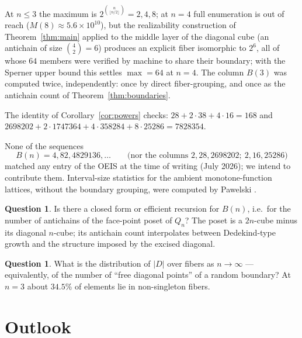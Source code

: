 \documentclass[11pt]{amsart}
\theoremstyle{definition}
\newtheorem{ques}[thm]{Question}
\newcommand{\lc}{Q}                       %
\begin{document}
At $n \le 3$ the maximum is $2^{\binom{n}{\lfloor n/2\rfloor}} =
2, 4, 8$; at $n = 4$ full enumeration is out of reach
($M(8) \approx 5.6 \times 10^{10}$), but the realizability
construction of Theorem~\ref{thm:main} applied to the middle layer
of the diagonal cube (an antichain of size $\binom{4}{2} = 6$)
produces an explicit fiber isomorphic to $2^{6}$, all of whose $64$
members were verified by machine to share their boundary; with the
Sperner upper bound this settles $\max = 64$ at $n = 4$.  The
column $B(3)$ was computed twice, independently: once by direct
fiber-grouping, and once as the antichain count of
Theorem~\ref{thm:boundaries}.

The identity of Corollary~\ref{cor:powers} checks:
$28 + 2\cdot 38 + 4 \cdot 16 = 168$ and
$2698202 + 2\cdot 1747364 + 4\cdot 358284 + 8 \cdot 25286 =
7828354$.

None of the sequences
\[
  B(n) = 4, 82, 4829136, \dots \qquad
  \text{(nor the columns } 2,28,2698202;\ 2,16,25286\text{)}
\]
matched any entry of the OEIS \cite{OEIS} at the time of writing
(July 2026); we intend to contribute them.  Interval-size statistics
for the ambient monotone-function lattices, without the boundary
grouping, were computed by Pawelski \cite{Pawelski}.

\begin{ques}
  Is there a closed form or efficient recursion for $B(n)$, i.e.\ for
  the number of antichains of the face-point poset of $\lc_n$?  The
  poset is a $2n$-cube minus its diagonal $n$-cube; its antichain
  count interpolates between Dedekind-type growth and the structure
  imposed by the excised diagonal.
\end{ques}

\begin{ques}
  What is the distribution of $|D|$ over fibers as
  $n \to \infty$ --- equivalently, of the number of ``free diagonal
  points'' of a random boundary?  At $n = 3$ about $34.5\%$ of
  elements lie in non-singleton fibers.
\end{ques}

\section{Outlook}
\label{sec:outlook}
\end{document}
